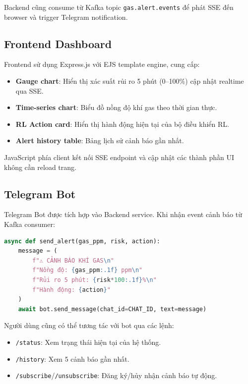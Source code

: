Backend cũng consume từ Kafka topic \texttt{gas.alert.events} để phát SSE đến browser và trigger Telegram notification.

\subsection{Frontend Dashboard}

Frontend sử dụng Express.js với EJS template engine, cung cấp:

\begin{itemize}
  \item \textbf{Gauge chart}: Hiển thị xác suất rủi ro 5 phút (0–100\%) cập nhật realtime qua SSE.
  \item \textbf{Time-series chart}: Biểu đồ nồng độ khí gas theo thời gian thực.
  \item \textbf{RL Action card}: Hiển thị hành động hiện tại của bộ điều khiển RL.
  \item \textbf{Alert history table}: Bảng lịch sử cảnh báo gần nhất.
\end{itemize}

JavaScript phía client kết nối SSE endpoint và cập nhật các thành phần UI không cần reload trang.

\subsection{Telegram Bot}

Telegram Bot được tích hợp vào Backend service. Khi nhận event cảnh báo từ Kafka consumer:

\begin{lstlisting}[language=Python, caption={Gửi cảnh báo qua Telegram}]
async def send_alert(gas_ppm, risk, action):
    message = (
        f"⚠️ CẢNH BÁO KHÍ GAS\n"
        f"Nồng độ: {gas_ppm:.1f} ppm\n"
        f"Rủi ro 5 phút: {risk*100:.1f}%\n"
        f"Hành động: {action}"
    )
    await bot.send_message(chat_id=CHAT_ID, text=message)
\end{lstlisting}

Người dùng cũng có thể tương tác với bot qua các lệnh:
\begin{itemize}
  \item \texttt{/status}: Xem trạng thái hiện tại của hệ thống.
  \item \texttt{/history}: Xem 5 cảnh báo gần nhất.
  \item \texttt{/subscribe}/\texttt{/unsubscribe}: Đăng ký/hủy nhận cảnh báo tự động.
\end{itemize}

